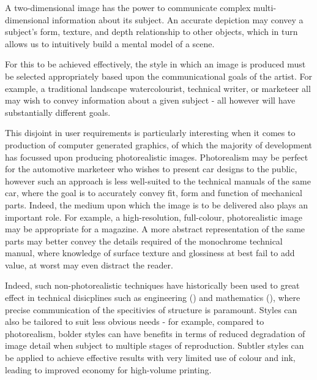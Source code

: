 A two-dimensional image has the power to communicate complex multi-dimensional information about its subject.
An accurate depiction may convey a subject's form, texture, and depth relationship to other objects, which in turn allows us to intuitively build a mental model of a scene.

For this to be achieved effectively, the style in which an image is produced must be selected appropriately based upon the communicational goals of the artist.
For example, a traditional landscape watercolourist, technical writer, or marketeer all may wish to convey information about a given subject - all however will have substantially different goals.

This disjoint in user requirements is particularly interesting when it comes to production of computer generated graphics, of which the majority of development has focussed upon producing photorealistic images.
Photorealism may be perfect for the automotive marketeer who wishes to present car designs to the public, however such an approach is less well-suited to the technical manuals of the same car, where the goal is to accurately convey fit, form and function of mechanical parts.
Indeed, the medium upon which the image is to be delivered also plays an important role.
For example, a high-resolution, full-colour, photorealistic image may be appropriate for a magazine. 
A more abstract representation of the same parts may better convey the details required of the monochrome technical manual, where knowledge of surface texture and glossiness at best fail to add value, at worst may even distract the reader.

Indeed, such non-photorealistic techniques have historically been used to great effect in technical disicplines such as engineering (\cite{porter1988}) and mathematics (\cite{francis2007}), where precise communication of the specitivies of structure is paramount. Styles can also be tailored to suit less obvious needs - for example, compared to photorealism, bolder styles can have benefits in terms of reduced degradation of image detail when subject to multiple stages of reproduction. Subtler styles can be applied to achieve effective results with very limited use of colour and ink, leading to improved economy for high-volume printing.

